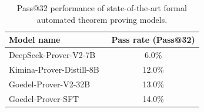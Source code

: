 \begin{table}[H]
\centering
\small
\begin{tabular}{lc}
\toprule
\textbf{Model name} & \textbf{Pass rate (Pass@32)} \\
\midrule
DeepSeek-Prover-V2-7B~\cite{ren2025deepseek} & 6.0\%  \\
Kimina-Prover-Distill-8B~\cite{AI-MO_KiminaProverDistill8B} & 12.0\% \\
Goedel-Prover-V2-32B~\cite{lin2025goedelv2} & 13.0\% \\
Goedel-Prover-SFT~\cite{lin2025goedel}  & 14.0\% \\
\bottomrule
\end{tabular}
\vspace{2mm}
\caption{Pass@32 performance of state-of-the-art formal automated theorem proving models.}
\label{tab:table_formal_evaluation}
\vspace{-7mm}
\end{table}

